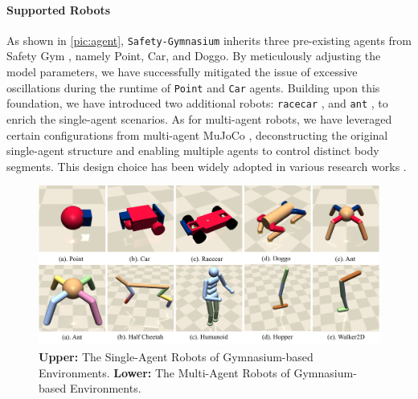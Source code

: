 \documentclass{article}
\begin{document}
\paragraph{Supported Robots}
As shown in \autoref{pic:agent}, \texttt{Safety-Gymnasium} inherits three pre-existing agents from Safety Gym \cite{ray2019benchmarking}, namely Point, Car, and Doggo. By meticulously adjusting the model parameters, we have successfully mitigated the issue of excessive oscillations during the runtime of \texttt{Point} and \texttt{Car} agents. Building upon this foundation, we have introduced two additional robots: \texttt{racecar} \cite{jacobs2002physiological, betz2019software}, and \texttt{ant} \cite{todorov2012mujoco}, to enrich the single-agent scenarios. As for multi-agent robots, we have leveraged certain configurations from multi-agent MuJoCo \cite{de2020deep}, deconstructing the original single-agent structure and enabling multiple agents to control distinct body segments. This design choice has been widely adopted in various research works \cite{kuba2021trust, yu2022surprising, gu2021multi}.

\begin{figure}[ht]
  \centering
  \includegraphics[width=\linewidth]{assets/main-paper/agent.pdf}
  \caption{\textbf{Upper: }The Single-Agent Robots of Gymnasium-based Environments. \textbf{Lower:} The Multi-Agent Robots of Gymnasium-based Environments.}
  \label{pic:agent}
\end{figure}
\end{document}
